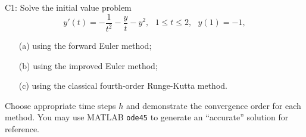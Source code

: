 \documentclass[12pt]{report}
\begin{document}
\begin{problem}
    C1: Solve the initial value problem
    \[ 
        y'(t) = - \frac{1}{t^2} - \frac{y}{t} - y^2, ~~~ 1 \leq t \leq 2, ~~~ y(1) = -1,
    \]
    \begin{enumerate}
        \item [(a)] using the forward Euler method;
        \item [(b)] using the improved Euler method;
        \item [(c)] using the classical fourth-order Runge-Kutta method.
    \end{enumerate}
    Choose appropriate time steps $h$ and demonstrate the convergence order for each method. You may use MATLAB \verb+ode45+ to generate an “accurate” solution for reference.
\end{problem}
\end{document}
